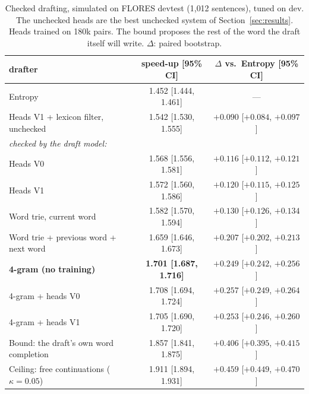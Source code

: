 \begin{table}[t]
\centering
\small
\begin{tabular}{lcc}
\toprule
drafter & speed-up [95\% CI] & $\Delta$ vs.\ Entropy [95\% CI] \\
\midrule
Entropy & 1.452 [1.444, 1.461] & --- \\
Heads V1 + lexicon filter, unchecked & 1.542 [1.530, 1.555] & $+0.090$ [$+0.084$, $+0.097$] \\
\midrule
\multicolumn{3}{l}{\emph{checked by the draft model:}} \\
Heads V0 & 1.568 [1.556, 1.581] & $+0.116$ [$+0.112$, $+0.121$] \\
Heads V1 & 1.572 [1.560, 1.586] & $+0.120$ [$+0.115$, $+0.125$] \\
Word trie, current word & 1.582 [1.570, 1.594] & $+0.130$ [$+0.126$, $+0.134$] \\
Word trie + previous word + next word & 1.659 [1.646, 1.673] & $+0.207$ [$+0.202$, $+0.213$] \\
\textbf{4-gram (no training)} & \textbf{1.701 [1.687, 1.716]} & $\mathbf{+0.249}$ [$+0.242$, $+0.256$] \\
4-gram + heads V0 & 1.708 [1.694, 1.724] & $+0.257$ [$+0.249$, $+0.264$] \\
4-gram + heads V1 & 1.705 [1.690, 1.720] & $+0.253$ [$+0.246$, $+0.260$] \\
\midrule
Bound: the draft's own word completion & 1.857 [1.841, 1.875] & $+0.406$ [$+0.395$, $+0.415$] \\
Ceiling: free continuations ($\kappa=0.05$) & 1.911 [1.894, 1.931] & $+0.459$ [$+0.449$, $+0.470$] \\
\bottomrule
\end{tabular}
\caption{Checked drafting, simulated on FLORES devtest (1{,}012 sentences), tuned on dev. The
unchecked heads are the best unchecked system of Section~\ref{sec:results}. Heads trained on 180k pairs. The
bound proposes the rest of the word the draft itself will write. $\Delta$: paired bootstrap.}
\label{tab:checked}
\end{table}

